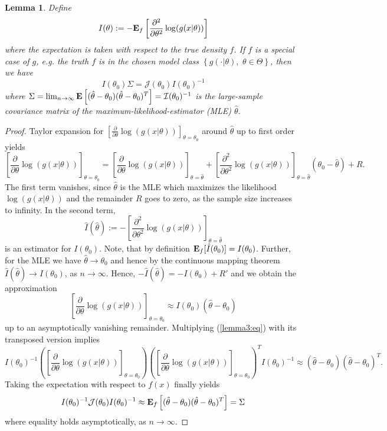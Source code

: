 \documentclass[a4paper, 11pt]{scrreprt}
\newtheorem{Lemma}[Theorem]{Lemma}
\newcommand{\ew}{\mbox{\textbf{E}}}
\begin{document}
\begin{Lemma}\label{aic:lemma3} \upshape
Define 
\[
I(\theta) := - \ew_f\left[ \frac{\partial^2}{\partial \theta^2} \log(g(x|\theta)) \right]
\]
where the expectation is taken with respect to the true density $f$. 
If $f$ is a special case of $g$, e.g. the truth $f$ is in the chosen model class $\left\{ g(\cdot | \theta),\,\, \theta\in\Theta \right\}$, then we have	
\[ 
I(\theta_0) \Sigma = \mathcal{J}(\theta_0) I(\theta_0)^{-1}
\]
where $\Sigma = \lim_{n\to\infty} \ew \left[(\hat{\theta} - \theta_0)(\hat{\theta} - \theta_0)^T \right] = \mathcal{I}(\theta_0)^{-1}$ is the large-sample covariance matrix of the maximum-likelihood-estimator (MLE) $\hat{\theta}$.
\end{Lemma}
\begin{proof}
Taylor expansion for $\left[ \frac{\partial}{\partial \theta} \log(g(x|\theta)) \right]_{\theta =\theta_0}$ around $\hat{\theta}$ up to first order yields
\begin{equation*}
\left[ \frac{\partial}{\partial \theta} \log(g(x|\theta)) \right]_{\theta=\theta_0}= \left[ \frac{\partial}{\partial \theta} \log(g(x|\theta)) \right]_{\theta=\hat{\theta}} + \left[ \frac{\partial^2}{\partial \theta^2} \log(g(x|\theta)) \right]_{\theta = \hat{\theta}} (\theta_0 - \hat{\theta}) + R.
\end{equation*}
The first term vanishes, since $\hat{\theta}$ is the MLE which maximizes the likelihood $\log(g(x|\theta))$ and the remainder $R$ goes to zero, as the sample size increases to infinity.
In the second term,
\[ \hat{I}(\hat{\theta}) := - \left[ \frac{\partial^2}{\partial \theta^2} \log(g(x|\theta)) \right]_{\theta = \hat{\theta} } \]
is an estimator for $I(\theta_0)$.
Note, that by definition $\ew_f[\hat{I}(\theta_0)] = I(\theta_0)$. Further, for the MLE we have $\hat{\theta} \to \theta_0$ and hence by the continuous mapping theorem $\hat{I}(\hat{\theta}) \to I(\theta_0)$,  as $n \to \infty$.
Hence, $- \hat{I}(\hat{\theta}) = - I(\theta_0) + R'$ and we obtain the approximation
\begin{equation}\label{lemma3:eq}
\left[ \frac{\partial}{\partial \theta} \log(g(x|\theta)) \right]_{\theta = \theta_0} \approx I(\theta_0)(\hat{\theta} - \theta_0)
\end{equation}
up to an asymptotically vanishing remainder. Multiplying (\ref{lemma3:eq}) with its transposed version implies
\[ 
I(\theta_0)^{-1} \left( \left[ \frac{\partial}{\partial \theta} \log(g(x|\theta)) \right]_{\theta = \theta_0}
 \right) \left( \left[ \frac{\partial}{\partial \theta} \log(g(x|\theta)) \right]_{\theta = \theta_0}
 \right)^T I(\theta_0)^{-1} \approx (\hat{\theta} - \theta_0)(\hat{\theta} - \theta_0)^T.
\]
Taking the expectation with respect to $f(x)$ finally yields
\[
I(\theta_0)^{-1} \mathcal{J}(\theta_0) I(\theta_0)^{-1} \approx 
\ew_f \left[ (\hat{\theta} - \theta_0)(\hat{\theta} - \theta_0)^T \right] = \Sigma
\] 
where equality holds asymptotically, as $n\to\infty$.
\end{proof}
\end{document}
